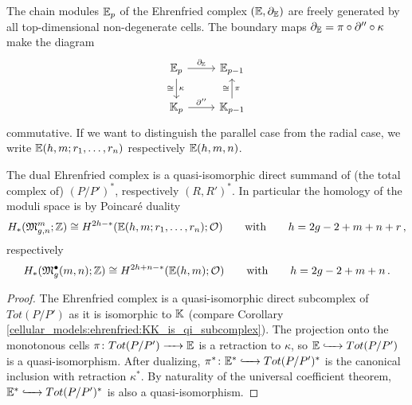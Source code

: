 \begin{defi}
    \label{cellular_models:Ehrenfried:defi}
    The chain modules $\E_p$ of the Ehrenfried complex $(\E, \del_\E)$ are freely generated by all top-dimensional non-degenerate cells.
    The boundary maps $\del_\E = \pi \circ \del'' \circ \kappa$ make the diagram
    \[
        \begin{tikzcd}
            \E_p \arrow{r}{\del_\E} \arrow{d}{\kappa}[swap]{\cong}      & \E_{p-1} \\
            \KK_p \arrow{r}{\del''}                                     & \KK_{p-1} \arrow{u}{\cong}[swap]{\pi}
        \end{tikzcd}
    \]
    commutative.
    If we want to distinguish the parallel case from the radial case, we write $\Ehrr$ respectively $\E(h,m,n)$.
\end{defi}

\begin{thm}
    \label{cellular_models:Ehrenfried:Ehrenfried_dual_is_quasi_isomorphic}
    The dual Ehrenfried complex is a quasi-isomorphic direct summand of (the total complex of) $(P/P')^\ast$, respectively $(R,R')^\ast$.
    In particular the homology of the moduli space is by Poincaré duality
    \[
        H_\ast (\Modspc; \Z) \cong H^{2h-\ast}( \Ehrr; \mc O ) \mspc{with}{20} h = 2g-2+m+n+r \,,
    \]
    respectively
    \[
         H_\ast (\ModspcRad; \Z) \cong H^{2h+n-\ast}( \E(h,m); \mc O ) \mspc{with}{20} h = 2g-2+m+n \,.
    \]
\end{thm}

\begin{proof}
    The Ehrenfried complex is a quasi-isomorphic direct subcomplex of $Tot(P/P')$ as it is isomorphic to $\KK$ (compare Corollary \ref{cellular_models:ehrenfried:KK_is_qi_subcomplex}).
    The projection onto the monotonous cells $\pi \colon Tot(P/P') \to \E$ is a retraction to $\kappa$, so $\E \xhr{} Tot(P/P')$ is a quasi-isomorphism.
    After dualizing, $\pi^\ast \colon \E^\ast \xhr{} Tot(P/P')^\ast$ is the canonical inclusion with retraction $\kappa^\ast$.
    By naturality of the universal coefficient theorem, $\E^\ast \xhr{} Tot(P/P')^\ast$ is also a quasi-isomorphism.
\end{proof}
